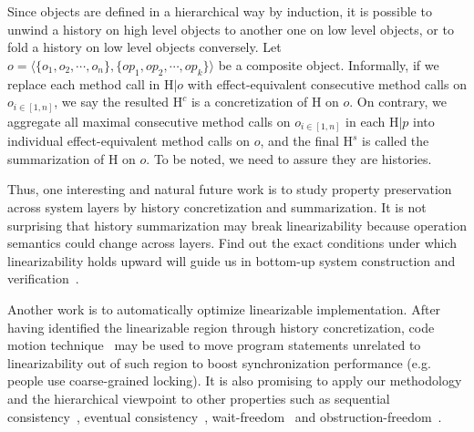 \documentclass[a4paper,USenglish]{lipics-v2016}
\newcommand{\lin}{linearizability}
\newcommand{\linb}{linearizable}
\newcommand{\his}{\text{H}}
\newcommand{\myvert}{\vert}
\begin{document}
Since objects are defined in a hierarchical way by induction,
it is possible to unwind a history on high level objects to another one on low level objects,
or to fold a history on low level objects conversely.
Let $o = \langle \{o_1, o_2, \cdots, o_n\}, \{op_1, op_2, \cdots, op_k\} \rangle$ be a composite object.
Informally, if we replace each method call in $\his \myvert o$ with effect-equivalent consecutive method calls on $o_{i \in [1, n]}$,
we say the resulted $\his^c$ is a concretization of $\his$ on $o$.
On contrary, we aggregate all maximal consecutive method calls on $o_{i \in [1, n]}$ in each $\his \myvert p$ into individual effect-equivalent method calls on $o$,
and the final $\his^s$ is called the summarization of $\his$ on $o$.
To be noted, we need to assure they are histories.


Thus, one interesting and natural future work is to study property preservation across system layers
by history concretization and summarization.
It is not surprising that history summarization may break {\lin} because operation semantics could change across layers.
Find out the exact conditions under which {\lin} holds upward
will guide us in bottom-up system construction and verification~\cite{export:121499, vafeiadis2009shape, Colvin06formalverification, Vafeiadis06provingcorrectness, DBLP:conf/esop/ZomerGRS14}.


Another work is to automatically optimize {\linb} implementation.
After having identified the {\linb} region through history concretization,
code motion technique~\cite{Aho:1986:CPT:6448, nnh2010} may be used to move program statements unrelated to {\lin} out of such region to boost synchronization performance (e.g. people use coarse-grained locking).
It is also promising to apply our methodology and the hierarchical viewpoint to other properties
such as sequential consistency~\cite{Lamport:1979:MMC:1311099.1311750},
eventual consistency~\cite{Vogels:2009:EC:1435417.1435432, Serafini:2010:ELS:1835698.1835723},
wait-freedom~\cite{Herlihy:1991:WS:114005.102808} and obstruction-freedom~\cite{Herlihy:2003}.



\end{document}
